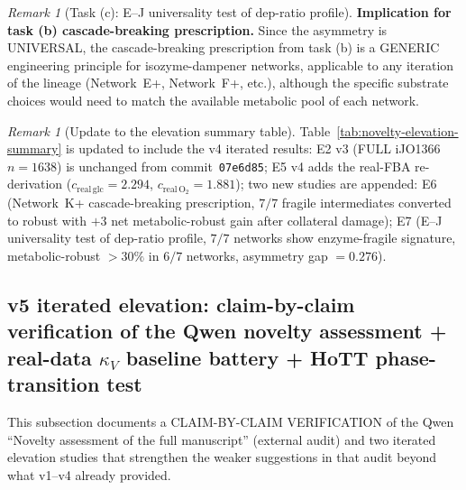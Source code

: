 \documentclass[11pt,a4paper]{article}
\theoremstyle{plain}
\theoremstyle{definition}
\theoremstyle{remark}
\newtheorem{remark}[theorem]{Remark}
\newcommand{\kk}{\kappa_{\!V}}
\begin{document}
\begin{remark}[Task (c): E--J universality test of dep-ratio profile]
\textbf{Implication for task (b) cascade-breaking prescription.} Since
the asymmetry is UNIVERSAL, the cascade-breaking prescription from
task (b) is a GENERIC engineering principle for isozyme-dampener
networks, applicable to any iteration of the lineage (Network~E+,
Network~F+, etc.), although the specific substrate choices would need
to match the available metabolic pool of each network.
\end{remark}

\begin{remark}[Update to the elevation summary table]
\label{rem:elevation-summary-table-v4}
Table~\ref{tab:novelty-elevation-summary} is updated to include the v4
iterated results: E2 v3 (FULL iJO1366 $n{=}1638$) is unchanged from
commit~\texttt{07e6d85}; E5 v4 adds the real-FBA re-derivation
($c_{\mathrm{real\,glc}} = 2.294$, $c_{\mathrm{real\,O_2}} = 1.881$);
two new studies are appended: E6 (Network~K+ cascade-breaking
prescription, $7/7$ fragile intermediates converted to robust with
$+3$ net metabolic-robust gain after collateral damage); E7
(E--J universality test of dep-ratio profile, $7/7$ networks show
enzyme-fragile signature, metabolic-robust $> 30\%$ in $6/7$ networks,
asymmetry gap $= 0.276$).
\end{remark}



\subsection{v5 iterated elevation: claim-by-claim verification of
the Qwen novelty assessment + real-data $\kk$ baseline battery +
HoTT phase-transition test}
\label{sec:novelty-v5}

This subsection documents a CLAIM-BY-CLAIM VERIFICATION of the Qwen
``Novelty assessment of the full manuscript'' (external audit) and
two iterated elevation studies that strengthen the weaker suggestions
in that audit beyond what v1--v4 already provided.
\end{document}
